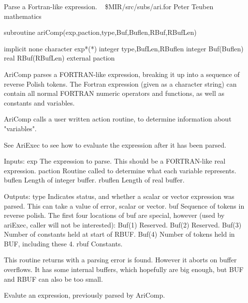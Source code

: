 %
\noindent Parse a Fortran-like expression.
\newline \ 
\newline {} \$MIR/src/subs/ari.for
\newline {} Peter Teuben
\newline {} mathematics
\par{\tenpoint
{\eightpoint\begintt
        subroutine ariComp(exp,paction,type,Buf,Buflen,RBuf,RBufLen)

        implicit none
        character exp*(*)
        integer type,BufLen,RBuflen
        integer Buf(Buflen)
        real    RBuf(RBufLen)
        external paction

  AriComp parses a FORTRAN-like expression, breaking it up into
  a sequence of reverse Polish tokens. The Fortran expression (given
  as a character string) can contain all normal FORTRAN numeric operators
  and functions, as well as constants and variables.

  AriComp calls a user written action routine, to determine information
  about "variables".

  See AriExec to see how to evaluate the expression after it has been
  parsed.

  Inputs:
    exp        The expression to parse. This should be a FORTRAN-like
               real expression.
    paction    Routine called to determine what each variable represents.
    buflen     Length of integer buffer.
    rbuflen    Length of real buffer.

  Outputs:
    type       Indicates status, and whether a scalar or vector expression
               was parsed. This can take a value of error, scalar or
               vector.
    buf        Sequence of tokens in reverse polish. The first four locations
               of buf are special, however (used by ariExec, caller
               will not be interested):
                 Buf(1)  Reserved.
                 Buf(2)  Reserved.
                 Buf(3)  Number of constants held at start of RBUF.
                 Buf(4)  Number of tokens held in BUF, including these 4.
    rbuf       Constants.

  This routine returns with a parsing error is found. However it aborts
  on buffer overflows. It has some internal buffers, which hopefully are
  big enough, but BUF and RBUF can also be too small.
\endtt}
\par}
%
\noindent Evalute an expression, previously parsed by AriComp.
\newline \ 
